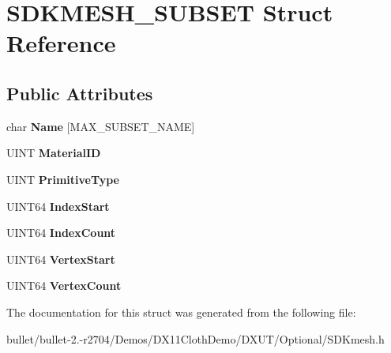\hypertarget{struct_s_d_k_m_e_s_h___s_u_b_s_e_t}{\section{S\+D\+K\+M\+E\+S\+H\+\_\+\+S\+U\+B\+S\+E\+T Struct Reference}
\label{struct_s_d_k_m_e_s_h___s_u_b_s_e_t}
}
\subsection*{Public Attributes}
\begin{DoxyCompactItemize}
\item 
\hypertarget{struct_s_d_k_m_e_s_h___s_u_b_s_e_t_a7d6e82a9e03b2e97f4b69dd370e257a2}{char {\bfseries Name} \mbox{[}M\+A\+X\+\_\+\+S\+U\+B\+S\+E\+T\+\_\+\+N\+A\+M\+E\mbox{]}}\label{struct_s_d_k_m_e_s_h___s_u_b_s_e_t_a7d6e82a9e03b2e97f4b69dd370e257a2}

\item 
\hypertarget{struct_s_d_k_m_e_s_h___s_u_b_s_e_t_a5c05c15730480cb8c7244e29da9b9b26}{U\+I\+N\+T {\bfseries Material\+I\+D}}\label{struct_s_d_k_m_e_s_h___s_u_b_s_e_t_a5c05c15730480cb8c7244e29da9b9b26}

\item 
\hypertarget{struct_s_d_k_m_e_s_h___s_u_b_s_e_t_ac1ec036eb340f3d1c28f5d9993991ce7}{U\+I\+N\+T {\bfseries Primitive\+Type}}\label{struct_s_d_k_m_e_s_h___s_u_b_s_e_t_ac1ec036eb340f3d1c28f5d9993991ce7}

\item 
\hypertarget{struct_s_d_k_m_e_s_h___s_u_b_s_e_t_a39b374d77f30cc3745b435387cc07d20}{U\+I\+N\+T64 {\bfseries Index\+Start}}\label{struct_s_d_k_m_e_s_h___s_u_b_s_e_t_a39b374d77f30cc3745b435387cc07d20}

\item 
\hypertarget{struct_s_d_k_m_e_s_h___s_u_b_s_e_t_a614d5966a12ebd8ab1f8adfb0aedde88}{U\+I\+N\+T64 {\bfseries Index\+Count}}\label{struct_s_d_k_m_e_s_h___s_u_b_s_e_t_a614d5966a12ebd8ab1f8adfb0aedde88}

\item 
\hypertarget{struct_s_d_k_m_e_s_h___s_u_b_s_e_t_a1207cefa6ec35635cd8bc70903cfe367}{U\+I\+N\+T64 {\bfseries Vertex\+Start}}\label{struct_s_d_k_m_e_s_h___s_u_b_s_e_t_a1207cefa6ec35635cd8bc70903cfe367}

\item 
\hypertarget{struct_s_d_k_m_e_s_h___s_u_b_s_e_t_a4b71e858d493b4c704059e477fc95b3b}{U\+I\+N\+T64 {\bfseries Vertex\+Count}}\label{struct_s_d_k_m_e_s_h___s_u_b_s_e_t_a4b71e858d493b4c704059e477fc95b3b}

\end{DoxyCompactItemize}


The documentation for this struct was generated from the following file\+:\begin{DoxyCompactItemize}
\item 
bullet/bullet-\/2.-\/r2704/\+Demos/\+D\+X11\+Cloth\+Demo/\+D\+X\+U\+T/\+Optional/S\+D\+Kmesh.\+h\end{DoxyCompactItemize}
